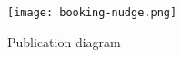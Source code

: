 
\begin{figure}[h]
    \centering
    \texttt{[image: booking-nudge.png]}
    \caption{Publication diagram}
    \label{fig:booking}
\end{figure}
